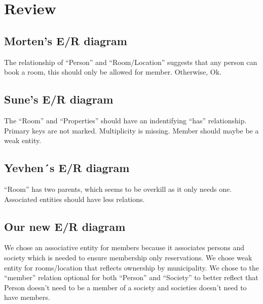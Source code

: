 \section{Review}


\subsection{Morten’s E/R diagram} 
The relationship of ``Person'' and ``Room/Location'' suggests that any person can book a room, this should only be allowed for member. Otherwise, Ok.

\subsection{Sune’s E/R diagram}
The ``Room'' and ``Properties'' should have an indentifying ``has'' relationship.
Primary keys are not marked. Multiplicity is missing. Member should maybe be a weak entity. 


\subsection{Yevhen´s E/R diagram}
``Room'' has two parents, which seems to be overkill as it only needs one. 
Associated entities should have less relations. 

\subsection{Our new E/R diagram}
We chose an associative entity for members because it associates persons and society which is needed 
to ensure membership only reservations.
We chose weak entity for rooms/location that reflects ownership by municipality. 
We chose to the ``member'' relation optional for both ``Person'' and ``Society''
to better reflect that Person doesn't need to be a member of a society and 
societies doesn't need to have members.

\newpage

